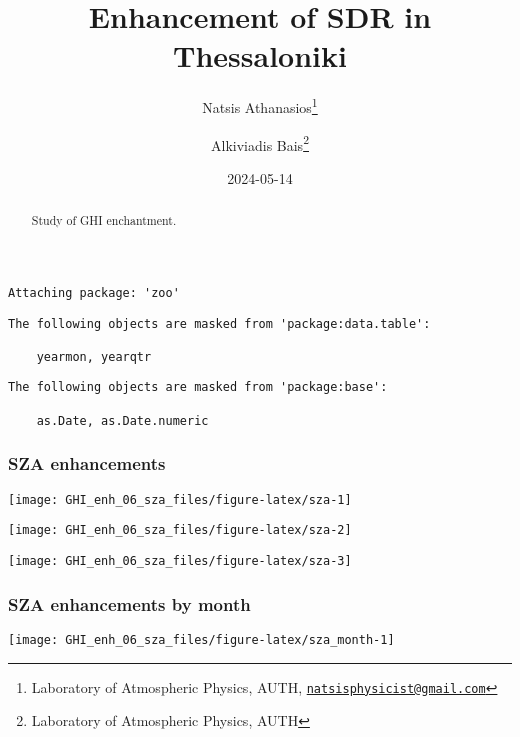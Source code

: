 \documentclass[
  10pt,
  a4paper,oneside]{article}
\title{Enhancement of SDR in Thessaloniki}
\author{Natsis Athanasios\footnote{Laboratory of Atmospheric Physics, AUTH, \href{mailto:natsisphysicist@gmail.com}{\nolinkurl{natsisphysicist@gmail.com}}} \and Alkiviadis Bais\footnote{Laboratory of Atmospheric Physics, AUTH}}
\date{2024-05-14}
\begin{document}
\maketitle
\begin{abstract}
Study of GHI enchantment.
\end{abstract}

{
\hypersetup{linkcolor=}
\setcounter{tocdepth}{4}
\tableofcontents
}
\begin{verbatim}
Attaching package: 'zoo'
\end{verbatim}

\begin{verbatim}
The following objects are masked from 'package:data.table':

    yearmon, yearqtr
\end{verbatim}

\begin{verbatim}
The following objects are masked from 'package:base':

    as.Date, as.Date.numeric
\end{verbatim}

\newpage
\FloatBarrier

\hypertarget{sza-enhancements}{%
\subsubsection{SZA enhancements}\label{sza-enhancements}}

\begin{center}\texttt{[image: GHI\_enh\_06\_sza\_files/figure-latex/sza-1]} \end{center}

\begin{center}\texttt{[image: GHI\_enh\_06\_sza\_files/figure-latex/sza-2]} \end{center}

\begin{center}\texttt{[image: GHI\_enh\_06\_sza\_files/figure-latex/sza-3]} \end{center}

\newpage
\FloatBarrier

\hypertarget{sza-enhancements-by-month}{%
\subsubsection{SZA enhancements by month}\label{sza-enhancements-by-month}}

\begin{center}\texttt{[image: GHI\_enh\_06\_sza\_files/figure-latex/sza\_month-1]} \end{center}
\end{document}
